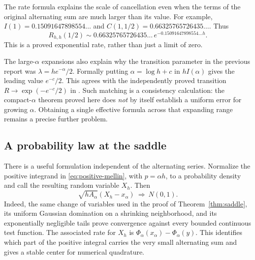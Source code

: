 The rate formula explains the scale of cancellation even when the terms
of the original alternating sum are much larger than its value. For
example, $I(1)=0.15091647898554\ldots$ and
$C(1,1/2)=0.66325765726435\ldots$. Thus
\[
 R_{h,h}(1/2)\sim0.66325765726435\ldots\,
 e^{-0.15091647898554\ldots h}.
\]
This is a proved exponential rate, rather than just a limit of zero.

The large-$\alpha$ expansions also explain why the transition parameter
in the previous report was $\lambda=he^{-\alpha}/2$. Formally putting
$\alpha=\log h+c$ in $hI(\alpha)$ gives the leading value
$e^{-c}/2$. This agrees with the independently proved transition
$R\to\exp(-e^{-c}/2)$ in \cite{repoHarmonic}. Such matching is a
consistency calculation: the compact-$\alpha$ theorem proved here does
\emph{not} by itself establish a uniform error for growing $\alpha$.
Obtaining a single effective formula across that expanding range
remains a precise further problem.

\subsection{A probability law at the saddle}

There is a useful formulation independent of the alternating series.
Normalize the positive integrand in \eqref{eq:positive-mellin}, with
$p=\alpha h$, to a probability density and call the resulting random
variable $X_h$. Then
\begin{equation}\label{eq:saddle-clt}
 \sqrt{hA_\alpha}(X_h-x_\alpha)
 \ \Longrightarrow\ N(0,1).
\end{equation}
Indeed, the same change of variables used in the proof of
Theorem~\ref{thm:saddle}, its uniform Gaussian domination on a shrinking
neighborhood, and its exponentially negligible tails prove convergence
against every bounded continuous test function. The associated rate
for $X_h$ is
$\Phi_\alpha(x_\alpha)-\Phi_\alpha(y)$.
This identifies which part of the positive integral carries the very
small alternating sum and gives a stable center for numerical quadrature.

